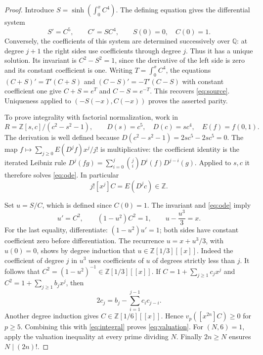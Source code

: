 \documentclass[11pt]{article}
\newcommand{\Q}{\mathbb{Q}}
\newcommand{\Z}{\mathbb{Z}}
\newcommand{\coeff}[2]{[#1]#2}
\begin{document}
\begin{proof}
Introduce $S=\sinh(\int_0^x C^4)$.
The defining equation gives the differential system
\begin{equation}\label{eq:ode}
S'=C^5,\qquad C'=SC^4,\qquad S(0)=0,\quad C(0)=1.
\end{equation}
Conversely, the coefficients of this system are determined successively
over $\Q$: at degree $j+1$ the right sides use coefficients through degree $j$.
Thus it has a unique solution. Its invariant is $C^2-S^2=1$, since
the derivative of the left side is zero and its constant coefficient is one.
Writing $T=\int_0^x C^4$, the equations
$(C+S)'=T'(C+S)$ and $(C-S)'=-T'(C-S)$ with constant coefficient one give
$C+S=e^T$ and $C-S=e^{-T}$. This recovers \eqref{eq:source}.
Uniqueness applied to $(-S(-x),C(-x))$ proves the asserted parity.

To prove integrality with factorial normalization, work in
\[
R=\Z[s,c]/(c^2-s^2-1),\qquad
D(s)=c^5,\quad D(c)=sc^4,\quad E(f)=f(0,1).
\]
The derivation is well defined because
$D(c^2-s^2-1)=2sc^5-2sc^5=0$.
The map $f\mapsto\sum_{j\geq0}E(D^j f)x^j/j!$ is multiplicative:
the coefficient identity is the iterated Leibniz rule
$D^j(fg)=\sum_{i=0}^j\binom jiD^i(f)D^{j-i}(g)$.
Applied to $s,c$ it therefore solves \eqref{eq:ode}.
In particular
\begin{equation}\label{eq:integral}
j!\coeff{x^j}{C}=E(D^jc)\in\Z.
\end{equation}

Set $u=S/C$, which is defined since $C(0)=1$. The invariant and
\eqref{eq:ode} imply
\begin{equation}\label{eq:cubic}
u'=C^2,\qquad (1-u^2)C^2=1,\qquad
u-\frac{u^3}{3}=x.
\end{equation}
For the last equality, differentiate: $(1-u^2)u'=1$; both sides have
constant coefficient zero before differentiation.
The recurrence $u=x+u^3/3$, with $u(0)=0$, shows by degree induction that
$u\in\Z[1/3][[x]]$. Indeed the coefficient of degree $j$ in $u^3$
uses coefficients of $u$ of degrees strictly less than $j$.
It follows that $C^2=(1-u^2)^{-1}\in\Z[1/3][[x]]$.
If $C=1+\sum_{j\geq1}c_jx^j$ and $C^2=1+\sum_{j\geq1}b_jx^j$, then
\[
2c_j=b_j-\sum_{i=1}^{j-1}c_i c_{j-i}.
\]
Another degree induction gives $C\in\Z[1/6][[x]]$.
Hence $v_p(\coeff{x^{2n}}{C})\geq0$ for $p\geq5$.
Combining this with \eqref{eq:integral} proves \eqref{eq:valuation}.
For $(N,6)=1$, apply the valuation inequality at every prime dividing $N$.
Finally $2n\geq N$ ensures $N\mid(2n)!$.
\end{proof}
\end{document}
